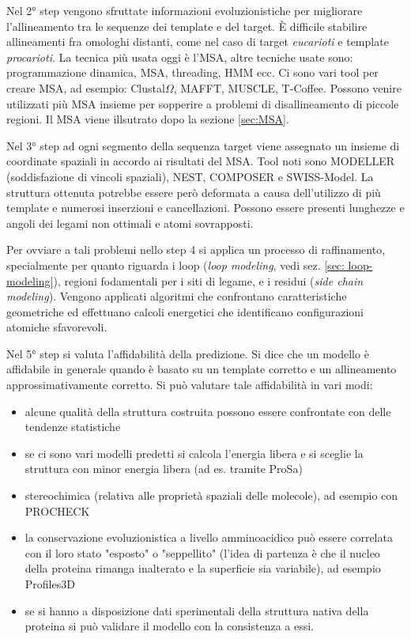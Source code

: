 {	\par Nel 2° step vengono sfruttate informazioni evoluzionistiche per migliorare l'allineamento tra le sequenze dei template e del target. È difficile stabilire allineamenti fra omologhi distanti, come nel caso di target \textit{eucarioti} e template \textit{procarioti}. La tecnica più usata oggi è l'MSA, altre tecniche usate sono: programmazione dinamica, MSA, threading, HMM ecc. Ci sono vari tool per creare MSA, ad esempio: Clustal$\Omega$, MAFFT, MUSCLE, T-Coffee. Possono venire utilizzati più MSA insieme per sopperire a problemi di disallineamento di piccole regioni. Il MSA viene illsutrato dopo la sezione \ref{sec:MSA}.
	
	\par Nel 3° step ad ogni segmento della sequenza target viene assegnato un insieme di coordinate spaziali in accordo ai risultati del MSA. Tool noti sono MODELLER (soddisfazione di vincoli spaziali), NEST, COMPOSER e SWISS-Model. La struttura ottenuta potrebbe essere però deformata a causa dell'utilizzo di più template e numerosi inserzioni e cancellazioni. Possono essere presenti lunghezze e angoli dei legami non ottimali e atomi sovrapposti.
	
	\par Per ovviare a tali problemi nello step 4 si applica un processo di raffinamento, specialmente per quanto riguarda i loop (\textit{loop modeling}, vedi sez. \ref{sec: loop-modeling}), regioni fodamentali per i siti di legame, e i residui (\textit{side chain modeling}). Vengono applicati algoritmi che confrontano caratteristiche geometriche ed effettuano calcoli energetici che identificano configurazioni atomiche sfavorevoli. 
	
	\par Nel 5° step si valuta l'affidabilità della predizione. Si dice che un modello è affidabile in generale quando è basato su un template corretto e un allineamento approssimativamente corretto. Si può valutare tale affidabilità in vari modi:
	
	\begin{itemize}
		\item alcune qualità della struttura costruita possono essere confrontate con delle tendenze statistiche 
		\item se ci sono vari modelli predetti si calcola l'energia libera e si sceglie la struttura con minor energia libera (ad es. tramite ProSa)
		\item stereochimica (relativa alle proprietà spaziali delle molecole), ad esempio con PROCHECK
		\item la conservazione evoluzionistica a livello amminoacidico può essere correlata con il loro stato "esposto" o "seppellito" (l'idea di partenza è che il nucleo della proteina rimanga inalterato e la superficie sia variabile), ad esempio Profiles3D
		\item se si hanno a disposizione dati sperimentali della struttura nativa della proteina si può validare il modello con la consistenza a essi.
	\end{itemize}
	
}
